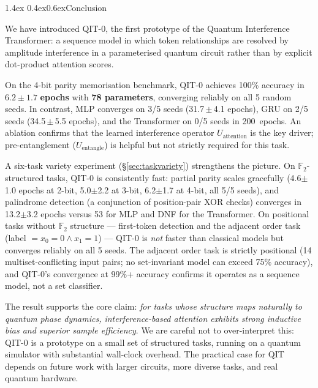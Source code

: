 \documentclass[11pt,a4paper]{article}
\makeatletter
\renewcommand\section{\@startsection{section}{1}{\z@}%
  {1.4ex \@plus 0.4ex}{0.6ex}{\normalfont\large\bfseries}}
\newcommand{\Uent}{U_{\!\text{entangle}}}
\newcommand{\Uatt}{U_{\!\text{attention}}}
\makeatother
\begin{document}
\section{Conclusion}
\label{sec:conclusion}

We have introduced QIT-0, the first prototype of the Quantum Interference Transformer:
a sequence model in which token relationships are resolved by amplitude interference in a
parameterised quantum circuit rather than by explicit dot-product attention scores.

On the 4-bit parity memorisation benchmark, QIT-0 achieves 100\% accuracy in
$\mathbf{6.2\pm1.7}$ \textbf{epochs} with \textbf{78 parameters}, converging reliably on
all 5 random seeds. In contrast, MLP converges on 3/5 seeds (31.7\,$\pm$\,4.1 epochs),
GRU on 2/5 seeds (34.5\,$\pm$\,5.5 epochs), and the Transformer on 0/5 seeds in 200~epochs.
An ablation confirms that the learned interference operator $\Uatt$ is the key driver;
pre-entanglement ($\Uent$) is helpful but not strictly required for this task.

A six-task variety experiment (\S\ref{sec:taskvariety}) strengthens the picture.
On $\mathbb{F}_2$-structured tasks, QIT-0 is consistently fast: partial parity
scales gracefully (4.6$\pm$1.0 epochs at 2-bit, 5.0$\pm$2.2 at 3-bit, 6.2$\pm$1.7 at
4-bit, all 5/5 seeds), and palindrome detection (a conjunction of position-pair XOR
checks) converges in 13.2$\pm$3.2 epochs versus 53 for MLP and DNF for the Transformer.
On positional tasks without $\mathbb{F}_2$ structure --- first-token detection and the
adjacent order task (label $= x_0{=}0 \wedge x_1{=}1$) --- QIT-0 is \emph{not} faster
than classical models but converges reliably on all 5 seeds.
The adjacent order task is strictly positional (14 multiset-conflicting input pairs;
no set-invariant model can exceed 75\% accuracy), and QIT-0's convergence at 99\%+
accuracy confirms it operates as a sequence model, not a set classifier.

The result supports the core claim: \emph{for tasks whose structure maps naturally to
quantum phase dynamics, interference-based attention exhibits strong inductive bias and
superior sample efficiency}. We are careful not to over-interpret this: QIT-0 is a
prototype on a small set of structured tasks, running on a quantum simulator with
substantial wall-clock overhead. The practical case for QIT depends on future work with
larger circuits, more diverse tasks, and real quantum hardware.
\end{document}
